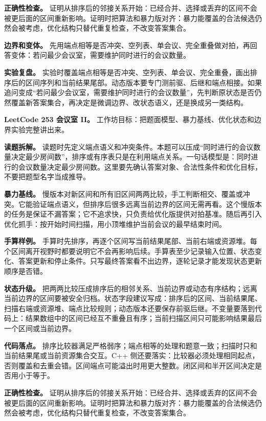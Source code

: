 \textbf{正确性检查。} 证明从排序后的邻接关系开始：已经合并、选择或丢弃的区间不会被更后面的区间重新影响。证明时把算法和暴力版对齐：暴力能覆盖的合法候选仍然会被考虑，优化结构只替代重复检查，不改变答案集合。

\textbf{边界和变体。} 先用端点相等是否冲突、空列表、单会议、完全重叠做对拍，再回答变体：若问最少会议室，需要维护同时进行的会议数量。

\textbf{实验复盘。} 实验时覆盖端点相等是否冲突、空列表、单会议、完全重叠，画出排序后的区间序列和当前结果尾部。动态版本要专门测前驱、后继和端点相接。如果追问变成“若问最少会议室，需要维护同时进行的会议数量”，先判断原状态是否仍然覆盖新答案集合，再决定是微调边界、改状态语义，还是换成另一类结构。

\noindent\textbf{LeetCode 253 会议室 II。} 工作坊目标：把题面模型、暴力基线、优化状态和边界实验完整讲出来。

\textbf{读题拆解。} 读题时先定义端点语义和冲突条件。本题可以压成“同时进行的会议数量决定最少房间数”，排序或有序表只是在利用端点关系。一句话模型是：同时进行的会议数量决定最少房间数。这里要先确认答案对象、合法性条件和优化目标，不要把题型名字当成推导。

\textbf{暴力基线。} 慢版本对新区间和所有旧区间两两比较，手工判断相交、覆盖或冲突。它能验证端点语义，但排序后很多远离当前边界的区间无需再看。这个慢版本的任务是保证不漏答案；它不追求快，只负责给优化版提供对拍基准。随后再引入优化抓手：按开始时间扫描，用小顶堆维护当前会议的最早结束时间。

\textbf{手算样例。} 手算时先排序，再逐个区间写当前结果尾部、当前右端或资源堆。每个区间离开视野时都要说明它不会再影响后续。手算表至少记录输入位置、状态变化、答案更新和停止条件。只写最终答案看不出边界，逐轮记录才能发现状态更新顺序是否错。

\textbf{状态升级。} 把两两比较压成排序后的相邻关系、当前边界或动态有序结构；远离当前边界的区间要被安全归档。状态字段建议写成：排序后的区间、当前结果尾、扫描右端或资源堆、端点比较规则；动态版本还要保存前驱后继。不变量要落到代码上：结果数组中的区间已经互不重叠且有序；当前扫描区间只可能影响结果最后一个区间或当前边界。

\textbf{代码落点。} 排序比较器满足严格弱序；端点相等的处理和题意一致；扫描时只和当前结果尾或当前资源集合交互。C++ 侧还要落实：比较器必须处理相同起点，否则覆盖和去重会错。区间端点可能溢出时用更大整数。闭区间和半开区间决定是否用小于等于。

\textbf{正确性检查。} 证明从排序后的邻接关系开始：已经合并、选择或丢弃的区间不会被更后面的区间重新影响。证明时把算法和暴力版对齐：暴力能覆盖的合法候选仍然会被考虑，优化结构只替代重复检查，不改变答案集合。

